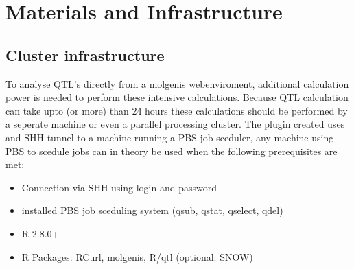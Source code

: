 \section{Materials and Infrastructure}
\subsection{Cluster infrastructure}
To analyse QTL's directly from a molgenis webenviroment, additional calculation power is needed to perform these intensive calculations. 
Because QTL calculation can take upto (or more) than 24 hours these calculations should be performed by a seperate machine 
or even a parallel processing cluster. The plugin created uses and SHH tunnel to a machine running a PBS job sceduler, any machine using PBS to scedule jobs  
can in theory be used when the following prerequisites are met:
\begin{itemize}
	\item Connection via SHH using login and password
	\item installed PBS job sceduling system (qsub, qstat, qselect, qdel) \cite{qstat06}
	\item R 2.8.0+
	\item R Packages: RCurl, molgenis, R/qtl (optional: SNOW)
\end{itemize}